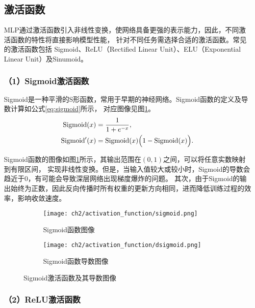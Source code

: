 \subsection{激活函数}

MLP通过激活函数引入非线性变换，使网络具备更强的表示能力，因此，不同激活函数的特性将直接影响模型性能，
针对不同任务需选择合适的激活函数。常见的激活函数包括
Sigmoid、ReLU（Rectified Linear Unit）、ELU（Exponential Linear Unit）及Sinumoid。

\subsubsection*{（1）Sigmoid激活函数}

Sigmoid是一种平滑的S形函数，常用于早期的神经网络。Sigmoid函数的定义及导数计算如公式\eqref{eq:sigmoid}所示，
对应图像见图\ref{fig:sigmoid}。
\begin{equation}
  \begin{aligned}
  \text{Sigmoid}(x) &= \frac{1}{1+e^{-x}}, \\
  \text{Sigmoid}'(x) &= \text{Sigmoid}(x)\Bigl(1-\text{Sigmoid}(x)\Bigr).
  \end{aligned}
  \label{eq:sigmoid}
\end{equation}

Sigmoid函数的图像如图\ref{fig:sigmoid}所示，其输出范围在$(0,1)$之间，可以将任意实数映射到有限区间，
实现非线性变换。但是，当输入值较大或较小时，Sigmoid的导数会趋近于0，有可能会导致深层网络出现梯度爆炸的问题。
其次，由于Sigmoid的输出始终为正数，因此反向传播时所有权重的更新方向相同，进而降低训练过程的效率，影响收敛速度。
\begin{figure}[H]
  \centering
  \begin{subfigure}[t]{0.45\textwidth}
    \centering
    \texttt{[image: ch2/activation\_function/sigmoid.png]}
    \caption{Sigmoid函数图像}
  \end{subfigure}
  \begin{subfigure}[t]{0.45\textwidth}
    \centering
    \texttt{[image: ch2/activation\_function/dsigmoid.png]}
    \caption{Sigmoid函数导数图像}
  \end{subfigure}
  \caption{Sigmoid激活函数及其导数图像}
  \label{fig:sigmoid}
\end{figure}

\subsubsection*{（2）ReLU激活函数}

